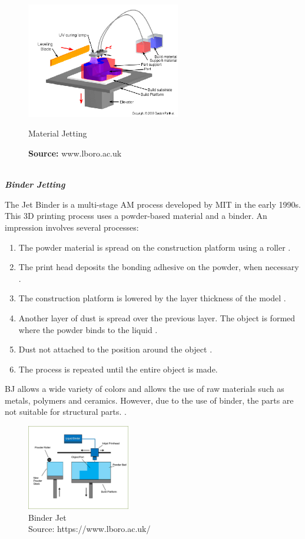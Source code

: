 \begin{figure}[h]
\centering
\includegraphics[width=0.6\textwidth]{./Images/MJ.jpg}
\caption{Material Jetting}
\label{MJ}
\caption*{\textbf{Source:} www.lboro.ac.uk}
\end{figure}
\\
\vspace{10}
\textbf{\emph{Binder Jetting}}\par
\vspace{10}
The Jet Binder is a multi-stage AM process developed by MIT in the early 1990s\cite{gokuldoss2017additive}.
This 3D printing process uses a powder-based material and a binder. An impression involves several processes:
\begin{enumerate}
    \item The powder material is spread on the construction platform using a roller \cite{lboro2}.
    \item The print head deposits the bonding adhesive on the powder, when necessary \cite{lboro2}.
    \item The construction platform is lowered by the layer thickness of the model \cite{lboro2}.
    \item Another layer of dust is spread over the previous layer. The object is formed where the powder binds to the liquid \cite{lboro2}.
    \item Dust not attached to the position around the object \cite{lboro2}.
    \item The process is repeated until the entire object is made\cite{lboro2}.
\end{enumerate}

\ac{BJ} allows a wide variety of colors and allows the use of raw materials such as metals, polymers and ceramics.
However, due to the use of binder, the parts are not suitable for structural parts. \cite{ziaee2019binder,gokuldoss2017additive}.

\begin{figure}[h]
\centering
\includegraphics[width=0.4\textwidth]{./Images/BinderJet.jpg}
\caption{Binder Jet\\
Source: https://www.lboro.ac.uk/}
\label{}
\end{figure}


